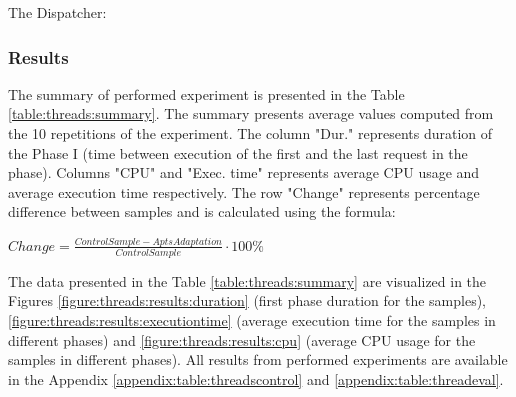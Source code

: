 \documentclass[12pt,a4paper]{article}
\begin{document}
The Dispatcher:

\vspace{1mm}\noindent{}\vspace{1mm}

\subsubsection{Results} 

The summary of performed experiment is presented in the Table \ref{table:threads:summary}. The summary presents average values computed from the 10 repetitions of the experiment. The column "Dur." represents duration of the Phase I (time between execution of the first and the last request in the phase). Columns "CPU" and "Exec. time" represents average CPU usage and average execution time respectively. The row "Change" represents percentage difference between samples and is calculated using the formula:

\begin{center}
$Change = \frac{ControlSample - AptsAdaptation}{ControlSample}\cdot 100\%$
\end{center}

The data presented in the Table \ref{table:threads:summary} are visualized in the Figures \ref{figure:threads:results:duration} (first phase duration for the samples), \ref{figure:threads:results:executiontime} (average execution time for the samples in different phases) and \ref{figure:threads:results:cpu} (average CPU usage for the samples in different phases). All results from
performed experiments are available in the Appendix \ref{appendix:table:threadscontrol} and \ref{appendix:table:threadeval}.
\end{document}
